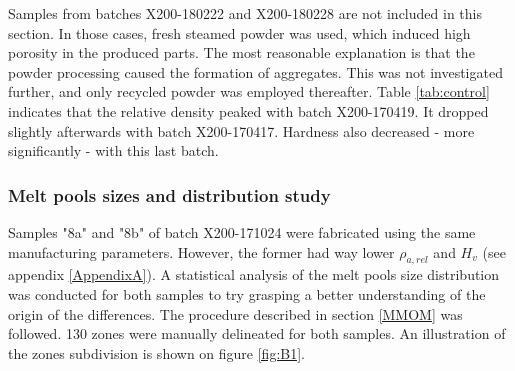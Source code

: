  \begin{center}
\begin{savenotes}
 \begin{table}[ht]
\noindent{}

\caption[Average hardness and relative density measurements for the control cubes of each batch]{Average hardness and relative density measurements for the control cubes of each batch}
\label{tab:control}
\end{table}
\end{savenotes}
 \end{center}

Samples from batches X200-180222 and X200-180228 are not included in this section. In those cases, fresh steamed powder was used, which induced high porosity in the produced parts. The most reasonable explanation is that the powder processing caused the formation of aggregates. This was not investigated further, and only recycled powder was employed thereafter. Table \ref{tab:control} indicates that the relative density peaked with batch X200-170419. It dropped slightly afterwards with batch X200-170417. Hardness also decreased - more significantly - with this last batch.\\

\subsubsection{Melt pools sizes and distribution study}

Samples "8a" and "8b" of batch X200-171024 were fabricated using the same manufacturing parameters. However, the former had way lower $\rho_{a,rel}$ and $H_v$ (see appendix \ref{AppendixA}). A statistical analysis of the melt pools size distribution was conducted for both samples to try grasping a better understanding of the origin of the differences. The procedure described in section \ref{MMOM} was followed. 130 zones were manually delineated for both samples. An illustration of the zones subdivision is shown on figure \ref{fig:B1}.\\

